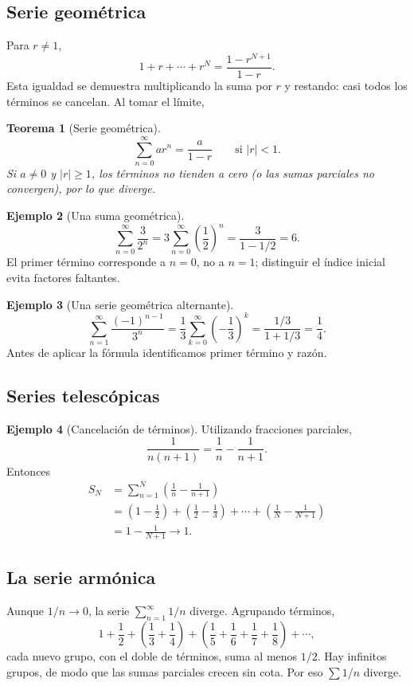 \documentclass[12pt]{article}
\newtheorem{teorema}{Teorema}[section]
\theoremstyle{definition}
\newtheorem{ejemplo}[teorema]{Ejemplo}
\theoremstyle{remark}
\begin{document}
\subsection*{Serie geométrica}
Para $r\ne1$,
\[1+r+\cdots+r^N=\frac{1-r^{N+1}}{1-r}.\]
Esta igualdad se demuestra multiplicando la suma por $r$ y restando: casi todos los términos se cancelan. Al tomar el límite,
\begin{teorema}[Serie geométrica]
\[\boxed{\sum_{n=0}^{\infty}ar^n=\frac{a}{1-r}\qquad\text{si }|r|<1.}\]
Si $a\ne0$ y $|r|\ge1$, los términos no tienden a cero (o las sumas parciales no convergen), por lo que diverge.
\end{teorema}
\begin{ejemplo}[Una suma geométrica]
\[\sum_{n=0}^\infty\frac{3}{2^n}
=3\sum_{n=0}^\infty\left(\frac12\right)^n
=\frac3{1-1/2}=\boxed6.\]
El primer término corresponde a $n=0$, no a $n=1$; distinguir el índice inicial evita factores faltantes.
\end{ejemplo}
\begin{ejemplo}[Una serie geométrica alternante]
\[\sum_{n=1}^\infty\frac{(-1)^{n-1}}{3^n}
=\frac13\sum_{k=0}^\infty\left(-\frac13\right)^k
=\frac{1/3}{1+1/3}=\boxed{\frac14}.\]
Antes de aplicar la fórmula identificamos primer término y razón.
\end{ejemplo}

\subsection*{Series telescópicas}
\begin{ejemplo}[Cancelación de términos]
Utilizando fracciones parciales,
\[\frac1{n(n+1)}=\frac1n-\frac1{n+1}.\]
Entonces
\begin{align*}
S_N&=\sum_{n=1}^N\left(\frac1n-\frac1{n+1}\right)\\
&=\left(1-\frac12\right)+\left(\frac12-\frac13\right)+\cdots+\left(\frac1N-\frac1{N+1}\right)\\
&=1-\frac1{N+1}\longrightarrow\boxed1.
\end{align*}
\end{ejemplo}

\subsection*{La serie armónica}
Aunque $1/n\to0$, la serie $\sum_{n=1}^{\infty}1/n$ diverge. Agrupando términos,
\[1+\frac12+\left(\frac13+\frac14\right)
+\left(\frac15+\frac16+\frac17+\frac18\right)+\cdots,\]
cada nuevo grupo, con el doble de términos, suma al menos $1/2$. Hay infinitos grupos, de modo que las sumas parciales crecen sin cota. Por eso $\sum1/n$ diverge.
\end{document}
